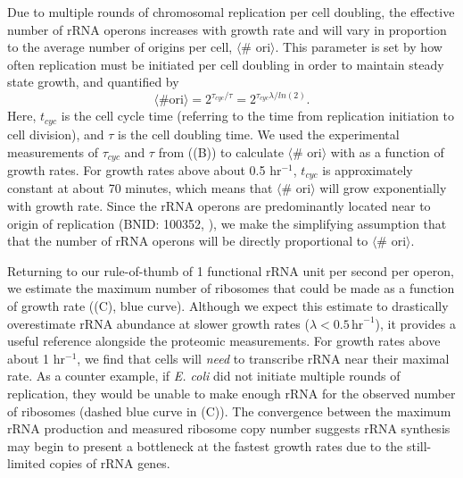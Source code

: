 Due to multiple rounds of chromosomal replication per cell doubling, the
effective number of rRNA operons increases with growth rate and will vary in
proportion to the average number of origins per cell, $\langle$\# ori$\rangle$.
This parameter is set by how often replication must be initiated per cell
doubling in order to maintain steady state growth, and quantified by
\begin{equation}
    \langle \text{\# ori} \rangle = 2^{\tau_{cyc} / \tau} = 2^{\tau_{cyc} \lambda / ln(2)}.
    \label{eq:Nori}
\end{equation}
Here, $t_{cyc}$ is the cell cycle time (referring to the time from replication
initiation to cell division), and $\tau$ is the cell doubling time.  We used the
experimental measurements of $\tau_{cyc}$ and  $\tau$ from \cite{si2017}
((B)) to calculate $\langle$\#
ori$\rangle$  with  as a function of growth rates. For growth rates
above about 0.5 hr$^{-1}$, $t_{cyc}$ is approximately constant at about 70
minutes, which means that $\langle$\# ori$\rangle$ will grow exponentially with
growth rate. Since the rRNA operons are predominantly located near to origin of
replication  (BNID: 100352, \cite{dennis2004}), we make the simplifying
assumption that that the number of rRNA operons  will be directly proportional
to $\langle$\# ori$\rangle$.

Returning to our rule-of-thumb of 1 functional rRNA unit per second per operon,
we estimate the maximum number of ribosomes that could be made as a function of
growth rate ((C), blue curve). Although we expect this
estimate to drastically overestimate rRNA abundance at slower growth rates
($\lambda < 0.5\, \text{hr}^{-1}$), it provides a useful reference alongside the
proteomic measurements. For growth rates above about 1 hr$^{-1}$, we find that
cells will \textit{need} to transcribe rRNA near their maximal rate. As a counter
example, if \textit{E. coli} did not initiate multiple rounds of replication,
they would be unable to make enough rRNA for the observed number of ribosomes
(dashed blue curve in (C)). The convergence between the
maximum rRNA production and measured ribosome copy number suggests rRNA
synthesis may begin to present a bottleneck at the fastest growth rates due to
the still-limited copies of rRNA genes.



%
